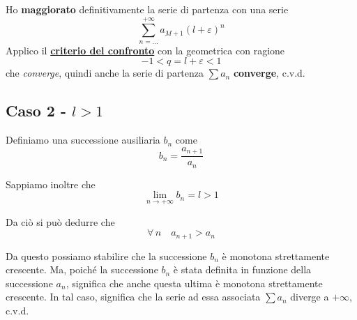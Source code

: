 \documentclass[../dimostrazioni]{subfiles}
\begin{document}
                Ho \textbf{maggiorato} definitivamente la serie di partenza con una serie
                \[ \sum_{n=\dots}^{+\infty} a_{M+1}(l + \varepsilon)^{n}\] 
                Applico il \textbf{\hyperref[serieconfronto]{criterio del confronto}} con la geometrica con ragione
                \[-1 < q = l + \varepsilon < 1 \]
                che \emph{converge}, quindi anche la serie di partenza \(\sum a_n \) \textbf{converge}, c.v.d.

            \subsection*{Caso 2 - \(l > 1\)}
                
                Definiamo una successione ausiliaria \(b_n\) come
                \[b_n = \frac{a_{n+1}}{a_n}\]

                Sappiamo inoltre che
                \[ \lim_{n \to +\infty}b_n = l > 1 \]

                Da ciò si può dedurre che
                \[\forall \, n \quad a_{n + 1} > a_n\]

                Da questo possiamo stabilire che la successione \(b_n\) è monotona strettamente crescente. Ma,
                poiché la successione \(b_n\) è stata definita in funzione della successione \(a_n\), significa
                che anche questa ultima è monotona strettamente crescente. In tal caso, significa che la serie ad
                essa associata \(\sum a_n\) diverge a \(+\infty\), c.v.d.
                
\end{document}
